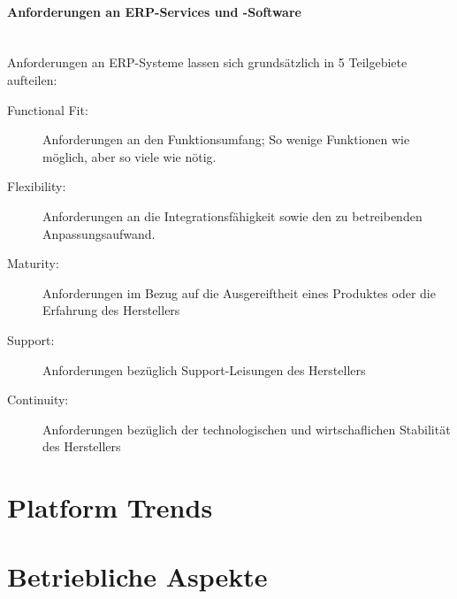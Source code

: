 \documentclass[a4paper, 11pt]{article}
\begin{document}
\paragraph{Anforderungen an ERP-Services und -Software}\mbox{}\\
Anforderungen an ERP-Systeme lassen sich grundsätzlich in 5 Teilgebiete aufteilen:
\begin{description}
	\item[Functional Fit: ] Anforderungen an den Funktionsumfang; So wenige Funktionen wie möglich, aber so viele wie nötig.
	\item[Flexibility: ] Anforderungen an die Integrationsfähigkeit sowie den zu betreibenden Anpassungsaufwand.
	\item[Maturity: ] Anforderungen im Bezug auf die Ausgereiftheit eines Produktes oder die Erfahrung des Herstellers
	\item[Support: ] Anforderungen bezüglich Support-Leisungen des Herstellers
	\item[Continuity: ] Anforderungen bezüglich der technologischen und wirtschaflichen Stabilität des Herstellers
\end{description}

\section{Platform Trends}

\section{Betriebliche Aspekte}
\end{document}

